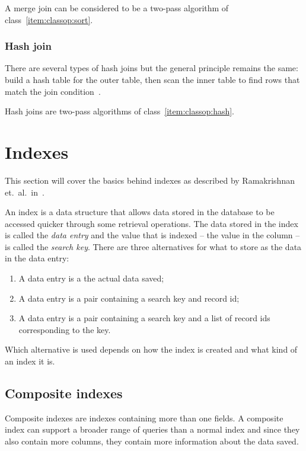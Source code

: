 A merge join can be considered to be a two-pass algorithm of
class~\ref{item:classop:sort}.

\subsubsection{Hash join}
There are several types of hash joins but the general principle remains the
same: build a hash table for the outer table, then scan the inner table to find
rows that match the join condition~\cite[p.
732-738]{garcia-molina_2002_database_dstcb}.

Hash joins are two-pass algorithms of class~\ref{item:classop:hash}.

\section{Indexes}
This section will cover the basics behind indexes as described by Ramakrishnan
et.\ al.\ in~\cite[Ch. 8]{ramakrishnan_2003_database_dms}.

An index is a data structure that allows data stored in the database to be
accessed quicker through some retrieval operations. The data stored in the index
is called the \textit{data entry} and the value that is indexed – the value in
the column – is called the \textit{search key}. There are three alternatives for
what to store as the data in the data entry:

\begin{enumerate}
\item\label{item:indexes:alt1} A data entry is a the actual data saved;
\item\label{item:indexes:alt2} A data entry is a pair containing a search key
  and record id;
\item\label{item:indexes:alt3} A data entry is a pair containing a search key
  and a list of record ids corresponding to the key.
\end{enumerate}

Which alternative is used depends on how the index is created and what kind of
an index it is.

\subsection{Composite indexes}
Composite indexes are indexes containing more than one fields. A composite index
can support a broader range of queries than a normal index and since they also
contain more columns, they contain more information about the data saved.

